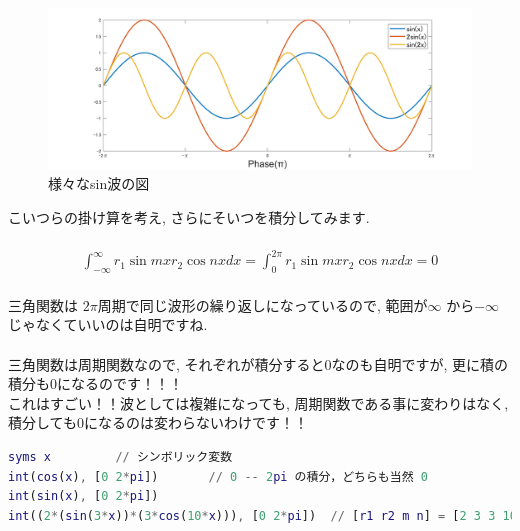 \documentclass[11pt,a4paper]{jreport}
\begin{document}
\begin{figure}[H]
\label{im:sincos}
  \centering
  \includegraphics[width=360mm,bb=0 0 1700 300]{../figures/sines.png}
  \caption{様々なsin波の図}
\end{figure}

こいつらの掛け算を考え, さらにそいつを積分してみます.\\
\\
\begin{eqnarray}
\label{eq:cosint}
  \int^\infty_{-\infty} r_1\sin mx r_2\cos nx dx = \int^{2\pi}_0 r_1\sin mx r_2\cos nx dx = 0
\end{eqnarray}
\\
三角関数は $2\pi$周期で同じ波形の繰り返しになっているので, 範囲が$\infty$ から$-\infty$じゃなくていいのは自明ですね.\\
\\
三角関数は周期関数なので, それぞれが積分すると0なのも自明ですが, 更に積の積分も0になるのです！！！\\
これはすごい！！波としては複雑になっても, 周期関数である事に変わりはなく, 積分しても0になるのは変わらないわけです！！\\

\begin{lstlisting}[caption=式(\ref{eq:cosint})あたりのコード,label=sc:cosint, keepspaces=true, language=Matlab]
syms x         // シンボリック変数
int(cos(x), [0 2*pi])       // 0 -- 2pi の積分，どちらも当然 0
int(sin(x), [0 2*pi])
int((2*(sin(3*x))*(3*cos(10*x))), [0 2*pi])  // [r1 r2 m n] = [2 3 3 10] の 0--2pi の積分. これも 0
\end{lstlisting}
\end{document}

